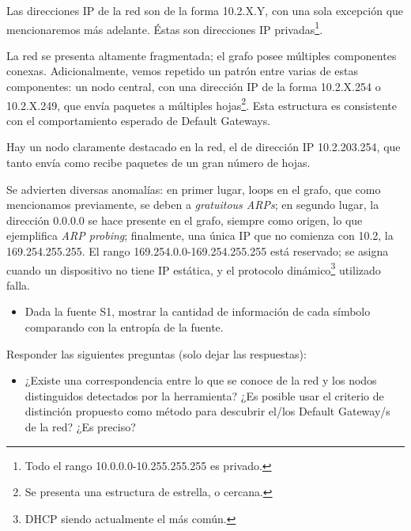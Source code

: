 \par Las direcciones IP de la red son de la forma 10.2.X.Y, con una sola excepción que mencionaremos más adelante.
Éstas son direcciones IP privadas\footnote{Todo el rango 10.0.0.0-10.255.255.255 es privado.}.

\par La red se presenta altamente fragmentada; el grafo posee múltiples componentes conexas.
Adicionalmente, vemos repetido un patrón entre varias de estas componentes: un nodo central, con una dirección IP de la forma 10.2.X.254 o 10.2.X.249, que envía paquetes a múltiples hojas\footnote{Se presenta una estructura de estrella, o cercana.}.
Esta estructura es consistente con el comportamiento esperado de Default Gateways. 

\par Hay un nodo claramente destacado en la red, el de dirección IP 10.2.203.254, que tanto envía como recibe paquetes de un gran número de hojas.

\par Se advierten diversas anomalías: en primer lugar, loops en el grafo, que como mencionamos previamente, se deben a \textit{gratuitous ARPs}; en segundo lugar, la dirección 0.0.0.0 se hace presente en el grafo, siempre como origen, lo que ejemplifica \textit{ARP probing}; finalmente, una única IP que no comienza con 10.2, la 169.254.255.255.
El rango 169.254.0.0-169.254.255.255 está reservado; se asigna cuando un dispositivo no tiene IP estática, y el protocolo dinámico\footnote{DHCP siendo actualmente el más común.} utilizado falla.

\begin{itemize}
	\item Dada la fuente S1, mostrar la cantidad de información de cada símbolo comparando con la entropía de la fuente.
\end{itemize}

Responder las siguientes preguntas (solo dejar las respuestas):

\begin{itemize}
	\item ¿Existe una correspondencia entre lo que se conoce de la red y los nodos distinguidos detectados por la herramienta? ¿Es posible usar el criterio de distinción propuesto como método para descubrir el/los Default Gateway/s de la red? ¿Es preciso?
\end{itemize}